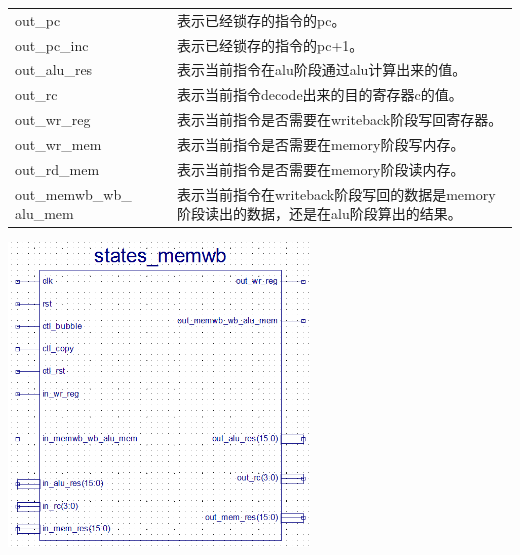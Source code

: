 \begin{center}
\begin{longtable}{p{}p{}}
        out\_pc &  表示已经锁存的指令的pc。\\
        out\_pc\_inc &  表示已经锁存的指令的pc+1。\\
        out\_alu\_res & 表示当前指令在alu阶段通过alu计算出来的值。\\
        out\_rc & 表示当前指令decode出来的目的寄存器c的值。\\
        out\_wr\_reg &  表示当前指令是否需要在writeback阶段写回寄存器。\\
        out\_wr\_mem &  表示当前指令是否需要在memory阶段写内存。\\
        out\_rd\_mem &  表示当前指令是否需要在memory阶段读内存。\\
        out\_memwb\_wb\_  alu\_mem & 表示当前指令在writeback阶段写回的数据是memory阶段读出的数据，还是在alu阶段算出的结果。\\
        \bottomrule
    \end{longtable}
\end{center}

\begin{center}
    \includegraphics[width=8cm]{image/detail/detail_memwb.png}
    \label{fig:memwb}
\end{center}

